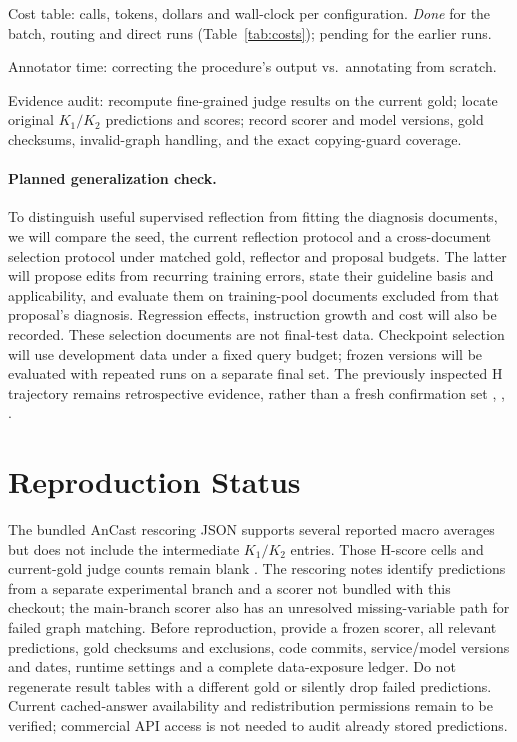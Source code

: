 \begin{description}[leftmargin=1em,itemsep=1pt,font=\normalfont\bfseries]
  \item[E11] Cost table: calls, tokens, dollars and wall-clock per configuration. \emph{Done} for the batch, routing and direct runs (Table~\ref{tab:costs}); pending for the earlier runs.
  \item[E12] Annotator time: correcting the procedure's output vs.\ annotating from scratch.
  \item[E13] Evidence audit: recompute fine-grained judge results on the current gold; locate original $K_1/K_2$ predictions and scores; record scorer and model versions, gold checksums, invalid-graph handling, and the exact copying-guard coverage.
\end{description}

\paragraph{Planned generalization check.} To distinguish useful supervised reflection from fitting the diagnosis documents, we will compare the seed, the current reflection protocol and a cross-document selection protocol under matched gold, reflector and proposal budgets. The latter will propose edits from recurring training errors, state their guideline basis and applicability, and evaluate them on training-pool documents excluded from that proposal's diagnosis. Regression effects, instruction growth and cost will also be recorded. These selection documents are not final-test data. Checkpoint selection will use development data under a fixed query budget; frozen versions will be evaluated with repeated runs on a separate final set. The previously inspected H trajectory remains retrospective evidence, rather than a fresh confirmation set , , .

\section{Reproduction Status}
The bundled AnCast rescoring JSON supports several reported macro averages but does not include the intermediate $K_1/K_2$ entries. Those H-score cells and current-gold judge counts remain blank . The rescoring notes identify predictions from a separate experimental branch and a scorer not bundled with this checkout; the main-branch scorer also has an unresolved missing-variable path for failed graph matching. Before reproduction, provide a frozen scorer, all relevant predictions, gold checksums and exclusions, code commits, service/model versions and dates, runtime settings and a complete data-exposure ledger. Do not regenerate result tables with a different gold or silently drop failed predictions. Current cached-answer availability and redistribution permissions remain to be verified; commercial API access is not needed to audit already stored predictions.

